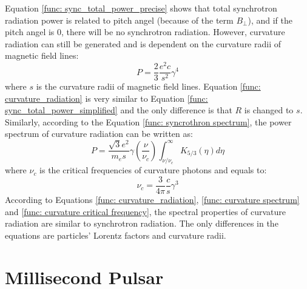 \documentclass[12pt]{report}
\begin{document}
          Equation \ref{func: sync_total_power_precise} shows that total synchrotron radiation 
          power is related to pitch angel (because of the term $B_\perp$), and if the 
          pitch angel is $0$, there will be no synchrotron radiation. However, curvature 
          radiation can still be generated and is dependent on the curvature radii of 
          magnetic field lines:
          \begin{equation}
            \label{func: curvature_radiation}
            P = \frac{2}{3}\frac{e^2c}{s^2}\gamma^4
          \end{equation}
          where $s$ is the curvature radii of magnetic field lines. 
          Equation \ref{func: curvature_radiation} is very similar to Equation 
          \ref{func: sync_total_power_simplified} and the only difference is that 
          $R$ is changed to $s$. Similarly, according to the Equation 
          \ref{func: syncrothron spectrum}, the power spectrum of curvature radiation can 
          be written as:
          \begin{equation}
            \label{func: curvature spectrum}
            P = \frac{\sqrt{3}e^2}{m_es}\gamma \left(\frac{\nu}{\nu_c}\right) \int_{\nu / \nu_c}^{\infty} K_{5/3}\left(\eta \right)d\eta
          \end{equation}
          where $\nu_c$ is the critical frequencies of curvature photons and equals to:
          \begin{equation}
            \label{func: curvature critical frequency}
            \nu_c = \frac{3}{4\pi}\frac{c}{s}\gamma^3
          \end{equation}
          According to Equations \ref{func: curvature_radiation}, \ref{func: curvature spectrum} 
          and \ref{func: curvature critical frequency}, the spectral properties of curvature 
          radiation are similar to synchrotron radiation. The only differences in the 
          equations are particles' Lorentz factors and curvature radii. 

      \section{Millisecond Pulsar} 
\end{document}
